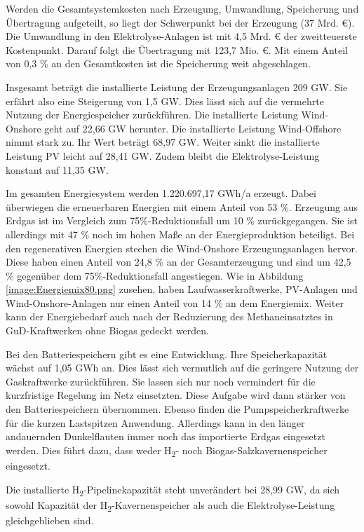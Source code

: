 Werden die Gesamtsystemkosten nach Erzeugung, Umwandlung, Speicherung und Über\-tragung aufgeteilt, so liegt der Schwerpunkt bei der Erzeugung (37 Mrd. €). Die Umwandlung in den Elektrolyse-Anlagen ist mit 4,5 Mrd. € der zweitteuerste Kostenpunkt. Darauf folgt die Übertragung mit 123,7 Mio. €. Mit einem Anteil von 0,3 \% an den Gesamtkosten ist die Speicherung weit abgeschlagen.

Insgesamt beträgt die installierte Leistung der Erzeugungsanlagen 209 GW. Sie erfährt also eine Steigerung von 1,5 GW. Dies lässt sich auf die vermehrte Nutzung der Energiespeicher zurückführen. Die installierte Leistung Wind-Onshore geht auf 22,66 GW herunter. Die installierte Leistung Wind-Offshore nimmt stark zu. Ihr Wert beträgt 68,97 GW. Weiter sinkt die installierte Leistung PV leicht auf 28,41 GW. Zudem bleibt die Elektrolyse-Leistung konstant auf 11,35 GW. 


Im gesamten Energiesystem werden 1.220.697,17 GWh/a erzeugt. Dabei überwiegen die erneuerbaren Energien mit einem Anteil von 53 \%. Erzeugung aus Erdgas ist im Vergleich zum 75\%-Reduktionsfall um 10 \% zurückgegangen. Sie ist allerdings mit 47 \% noch im hohen Maße an der Energieproduktion beteiligt. Bei den regenerativen Energien stechen die Wind-Onshore Erzeugungsanlagen hervor. Diese haben einen Anteil von 24,8 \% an der Gesamterzeugung und sind um 42,5 \% gegenüber dem 75\%-Reduktionsfall angestiegen. Wie in Abbildung \ref{image:Energiemix80.png} zusehen, haben Laufwasserkraftwerke, PV-Anlagen und Wind-Onshore-Anlagen nur einen Anteil von 14 \% an dem Energiemix. Weiter kann der Energiebedarf auch nach der Reduzierung des Methaneinsatztes in GuD-Kraftwerken ohne Biogas gedeckt werden. 


Bei den Batteriespeichern gibt es eine Entwicklung. Ihre Speicherkapazität wächst auf 1,05 GWh an. Dies lässt sich vermutlich auf die geringere Nutzung der Gaskraftwerke zurückführen. Sie lassen sich nur noch vermindert für die kurzfristige Regelung im Netz einsetzten. Diese Aufgabe wird dann stärker von den Batteriespeichern übernommen. Ebenso finden die Pumpspeicherkraftwerke für die kurzen Lastspitzen Anwendung. Allerdings kann in den länger andauernden Dunkelflauten immer noch das importierte Erdgas eingesetzt werden. Dies führt dazu, dass weder H\textsubscript{2}- noch Biogas-Salzkavernenspeicher eingesetzt.

Die installierte H\textsubscript{2}-Pipelinekapazität steht unverändert bei 28,99 GW, da sich sowohl Kapazität der H\textsubscript{2}-Kavernenspeicher als auch die Elektrolyse-Leistung gleichgeblieben sind.

